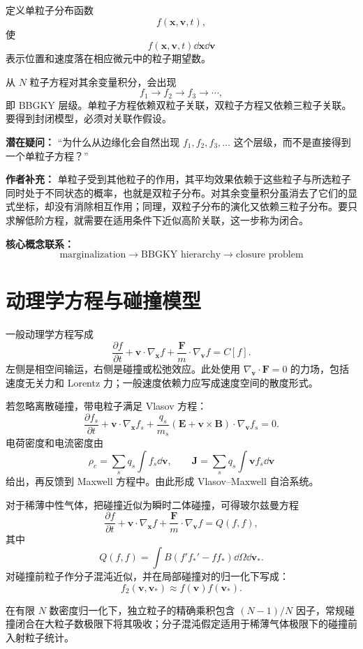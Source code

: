定义单粒子分布函数
\[
f(\bm x,\bm v,t),
\]
使
\[
f(\bm x,\bm v,t)\dd\bm x\dd\bm v
\]
表示位置和速度落在相应微元中的粒子期望数。

从 \(N\) 粒子方程对其余变量积分，会出现
\[
f_1\longrightarrow f_2\longrightarrow f_3\longrightarrow\cdots,
\]
即 BBGKY 层级。单粒子方程依赖双粒子关联，双粒子方程又依赖三粒子关联。要得到封闭模型，必须对关联作假设。

\begin{authornote}
\textbf{潜在疑问：}
“为什么从边缘化会自然出现 \(f_1,f_2,f_3,\dots\) 这个层级，而不是直接得到一个单粒子方程？”

\textbf{作者补充：}
单粒子受到其他粒子的作用，其平均效果依赖于这些粒子与所选粒子同时处于不同状态的概率，也就是双粒子分布。对其余变量积分虽消去了它们的显式坐标，却没有消除相互作用；同理，双粒子分布的演化又依赖三粒子分布。要只求解低阶方程，就需要在适用条件下近似高阶关联，这一步称为闭合。

\textbf{核心概念联系：}
\[
\text{marginalization}
\longrightarrow
\text{BBGKY hierarchy}
\longrightarrow
\text{closure problem}
\]
\end{authornote}

\section{动理学方程与碰撞模型}
一般动理学方程写成
\[
\frac{\partial f}{\partial t}
+\bm v\cdot\nabla_{\bm x}f
+\frac{\bm F}{m}\cdot\nabla_{\bm v}f
=C[f].
\]
左侧是相空间输运，右侧是碰撞或松弛效应。此处使用 $\nabla_{\bm v}\cdot\bm F=0$ 的力场，包括速度无关力和 Lorentz 力；一般速度依赖力应写成速度空间的散度形式。

若忽略离散碰撞，带电粒子满足 Vlasov 方程：
\[
\frac{\partial f_s}{\partial t}
+\bm v\cdot\nabla_{\bm x}f_s
+\frac{q_s}{m_s}
(\bm E+\bm v\times\bm B)\cdot\nabla_{\bm v}f_s=0.
\]
电荷密度和电流密度由
\[
\rho_c=\sum_s q_s\int f_s\dd\bm v,
\qquad
\bm J=\sum_s q_s\int \bm v f_s\dd\bm v
\]
给出，再反馈到 Maxwell 方程中。由此形成 Vlasov--Maxwell 自洽系统。

对于稀薄中性气体，把碰撞近似为瞬时二体碰撞，可得玻尔兹曼方程
\[
\frac{\partial f}{\partial t}
+\bm v\cdot\nabla_{\bm x}f
+\frac{\bm F}{m}\cdot\nabla_{\bm v}f
=Q(f,f),
\]
其中
\[
Q(f,f)
=
\int B\left(f'f_*'-ff_*\right)\dd\Omega\dd\bm v_*.
\]
对碰撞前粒子作分子混沌近似，并在局部碰撞对的归一化下写成：
\[
f_2(\bm v,\bm v_*)\approx f(\bm v)f(\bm v_*).
\]

在有限 $N$ 数密度归一化下，独立粒子的精确乘积包含 $(N-1)/N$ 因子，常规碰撞闭合在大粒子数极限下将其吸收；分子混沌假定适用于稀薄气体极限下的碰撞前入射粒子统计。

